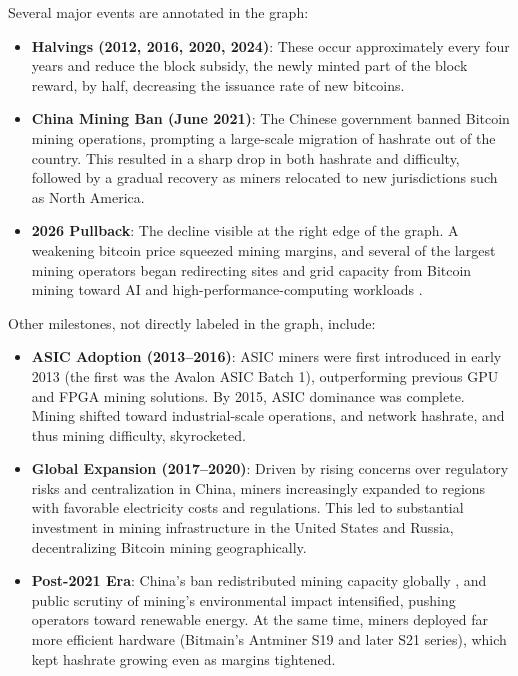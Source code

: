 Several major events are annotated in the graph:

\begin{itemize}
  \item \textbf{Halvings (2012, 2016, 2020, 2024)}: These occur approximately every four years and reduce the block subsidy, the newly minted part of the block reward, by half, decreasing the issuance rate of new bitcoins.

  \item \textbf{China Mining Ban (June 2021)}: The Chinese government banned Bitcoin mining operations, prompting a large-scale migration of hashrate out of the country. This resulted in a sharp drop in both hashrate and difficulty, followed by a gradual recovery as miners relocated to new jurisdictions such as North America.

  \item \textbf{2026 Pullback}: The decline visible at the right edge of the graph. A weakening bitcoin price squeezed mining margins, and several of the largest mining operators began redirecting sites and grid capacity from Bitcoin mining toward AI and high-performance-computing workloads \autocite{CoinSharesMiningQ12026,CoreScientificQ22026,TeraWulfQ22026}. %
\end{itemize}

Other milestones, not directly labeled in the graph, include:

\begin{itemize}
  \item \textbf{ASIC Adoption (2013--2016)}: ASIC miners were first introduced in early 2013 (the first was the Avalon ASIC Batch 1), outperforming previous GPU and FPGA mining solutions. By 2015, ASIC dominance was complete. Mining shifted toward industrial-scale operations, and network hashrate, and thus mining difficulty, skyrocketed.

  \item \textbf{Global Expansion (2017--2020)}: Driven by rising concerns over regulatory risks and centralization in China, miners increasingly expanded to regions with favorable electricity costs and regulations. This led to substantial investment in mining infrastructure in the United States and Russia, decentralizing Bitcoin mining geographically.

  \item \textbf{Post-2021 Era}: China's ban redistributed mining capacity globally \autocite{Reuters2021,CCAF2021}, and public scrutiny of mining's environmental impact intensified, pushing operators toward renewable energy. At the same time, miners deployed far more efficient hardware (Bitmain's Antminer S19 and later S21 series), which kept hashrate growing even as margins tightened.
\end{itemize}

